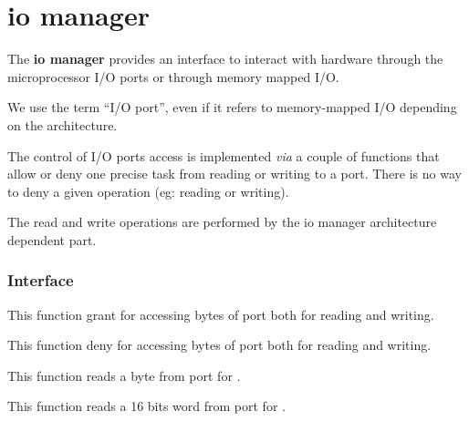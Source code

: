 %
%

\section{io manager}

The \textbf{io manager} provides an interface to interact with
hardware through the microprocessor I/O ports or through memory mapped
I/O.

We use the term ``I/O port'', even if it refers to memory-mapped I/O
depending on the architecture.

The control of I/O ports access is implemented \textit{via} a couple
of functions that allow or deny one precise task from reading or
writing to a port. There is no way to deny a given operation (eg:
reading or writing).

The read and write operations are performed by the io manager
architecture dependent part.

%
%

\subsubsection{Interface}

	 {
	   This function grant  for accessing
	    bytes of  port both for
	   reading and writing.
	 }

	 {
	   This function deny  for accessing
	    bytes of  port both for
	   reading and writing.
	 }

	 {
	   This function reads a byte from  port for
	   .
         }

	 {
	   This function reads a 16 bits word from  port for
	   .
         }

